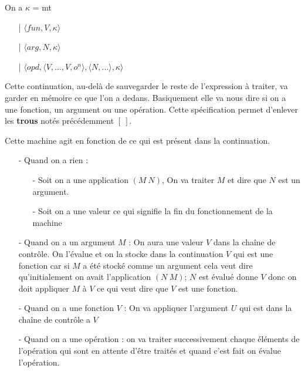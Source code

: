 \documentclass[10pt,a4paper]{report}
\begin{document}
	On a $\kappa$ = mt
	\begin{itemize}
		\item[|] $\langle fun,V,\kappa \rangle$
		\item[|] $\langle arg,N,\kappa \rangle$
		\item[|] $\langle opd,\langle V,...,V,o^{n}\rangle,\langle N,... \rangle,\kappa \rangle$
	\end{itemize}
	\smallbreak
	Cette continuation, au-delà de sauvegarder le reste de l'expression à traiter, va garder en mémoire ce que l'on a dedans. Basiquement elle va nous dire si on a une fonction, un argument ou une opération. Cette spécification permet d'enlever les \textbf{trous} notés précédemment $[~]$.
	\medbreak
	
	Cette machine agit en fonction de ce qui est présent dans la continuation.
	\begin{itemize}
		\item[] - Quand on a rien :
		\begin{itemize}
			\item[] - Soit on a une application $(M~N)$, On va traiter $M$ et dire que $N$ est un argument.
			\item[] - Soit on a une valeur ce qui signifie la fin du fonctionnement de la machine
		\end{itemize}
		\item[] - Quand on a un argument $M$ : On aura une valeur $V$ dans la chaîne de contrôle. On l'évalue et on la stocke dans la continuation $V$ qui est une fonction car si $M$ a été stocké comme un argument cela veut dire qu'initialement on avait l'application $(N~M)$; $N$ est évalué donne $V$ donc on doit appliquer $M$ à $V$ ce qui veut dire que $V$ est une fonction.
		\item[] - Quand on a une fonction $V$ : On va appliquer l'argument $U$ qui est dans la chaîne de contrôle a $V$
		\item[] - Quand on a une opération : on va traiter successivement chaque éléments de l'opération qui sont en attente d'être traités et quand c'est fait on évalue l'opération. 
	\end{itemize}
	\bigbreak
	
\end{document}
